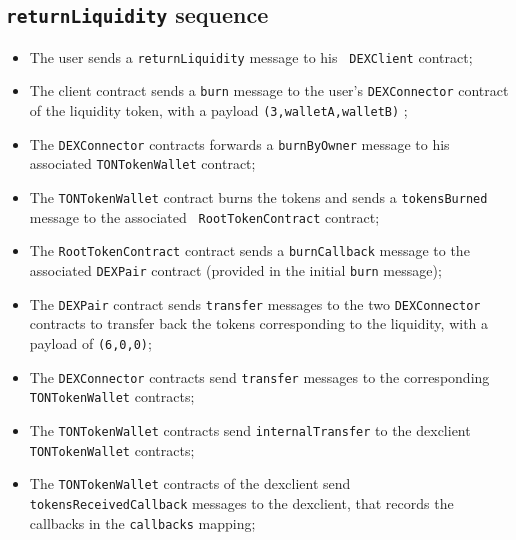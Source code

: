 \subsection{{\tt returnLiquidity} sequence}

\begin{itemize}
\item The user sends a {\tt returnLiquidity} message to his {\tt
  DEXClient} contract;
\item The client contract sends a {\tt burn} message to the user's
  {\tt DEXConnector} contract of the liquidity token, with a payload
  {\tt (3,walletA,walletB)} ;
\item The {\tt DEXConnector} contracts forwards a {\tt burnByOwner}
  message to his associated {\tt TONTokenWallet} contract;
\item The {\tt TONTokenWallet} contract burns the tokens and sends a
  {\tt tokensBurned} message to the associated {\tt
    RootTokenContract} contract;
\item The {\tt RootTokenContract} contract sends a {\tt burnCallback}
  message to the associated {\tt DEXPair} contract (provided in the
  initial {\tt burn} message);
\item The {\tt DEXPair} contract sends {\tt transfer} messages to the
  two {\tt DEXConnector} contracts to transfer back the tokens
  corresponding to the liquidity, with a payload of {\tt (6,0,0)};
\item The {\tt DEXConnector} contracts send {\tt transfer} messages to
  the corresponding {\tt TONTokenWallet} contracts;
\item The {\tt TONTokenWallet} contracts send {\tt internalTransfer}
  to the dexclient {\tt TONTokenWallet} contracts;
\item The {\tt TONTokenWallet} contracts of the dexclient send {\tt
  tokensReceivedCallback} messages to the dexclient, that records the
  callbacks in the {\tt callbacks} mapping;
\end{itemize}
